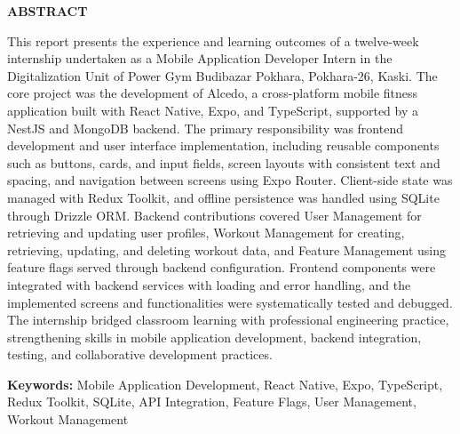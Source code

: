 \clearpage

\begin{center}
{\bfseries\fontsize{14}{17}\selectfont ABSTRACT}
\end{center}

\vspace{0.3in}
This report presents the experience and learning outcomes of a twelve-week internship undertaken as a Mobile Application Developer Intern in the Digitalization Unit of Power Gym Budibazar Pokhara, Pokhara-26, Kaski. The core project was the development of Alcedo, a cross-platform mobile fitness application built with React Native, Expo, and TypeScript, supported by a NestJS and MongoDB backend. The primary responsibility was frontend development and user interface implementation, including reusable components such as buttons, cards, and input fields, screen layouts with consistent text and spacing, and navigation between screens using Expo Router. Client-side state was managed with Redux Toolkit, and offline persistence was handled using SQLite through Drizzle ORM. Backend contributions covered User Management for retrieving and updating user profiles, Workout Management for creating, retrieving, updating, and deleting workout data, and Feature Management using feature flags served through backend configuration. Frontend components were integrated with backend services with loading and error handling, and the implemented screens and functionalities were systematically tested and debugged. The internship bridged classroom learning with professional engineering practice, strengthening skills in mobile application development, backend integration, testing, and collaborative development practices.

\vspace{1.5em}
\noindent\textbf{Keywords:} Mobile Application Development, React Native, Expo, TypeScript, Redux Toolkit, SQLite, API Integration, Feature Flags, User Management, Workout Management